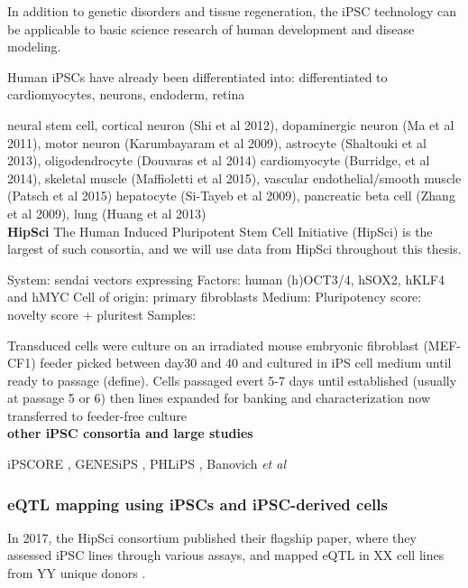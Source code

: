 In addition to genetic disorders and tissue regeneration, the iPSC technology can be applicable to basic science research of human development and disease modeling.

Human iPSCs have already been differentiated into: 
differentiated to cardiomyocytes, neurons, endoderm, retina

neural stem cell, cortical neuron (Shi et al 2012), dopaminergic neuron (Ma et al 2011), motor neuron (Karumbayaram et al 2009), astrocyte (Shaltouki et al 2013), oligodendrocyte (Douvaras et al 2014)
cardiomyocyte (Burridge, et al 2014), skeletal muscle (Maffioletti et al 2015), vascular endothelial/smooth muscle (Patsch et al 2015)
hepatocyte (Si-Tayeb et al 2009), pancreatic beta cell (Zhang et al 2009), lung (Huang et al 2013)\\



\textbf{HipSci}
The Human Induced Pluripotent Stem Cell Initiative (HipSci) is the largest of such consortia, and we will use data from HipSci \cite{kilpinen2017common} throughout this thesis.

System: sendai vectors expressing  
Factors: human (h)OCT3/4, hSOX2, hKLF4 and hMYC
Cell of origin: primary fibroblasts
Medium:
Pluripotency score: novelty score + pluritest \cite{muller2011bioinformatic}
Samples:

Transduced cells were culture on an irradiated mouse embryonic fibroblast (MEF-CF1) feeder
picked between day30 and 40 and cultured in iPS cell medium until ready to passage (define). 
Cells passaged evert 5-7 days until established (usually at passage 5 or 6)
then lines expanded for banking and characterization
now transferred to feeder-free culture\\

\textbf{other iPSC consortia and large studies}

iPSCORE \cite{panopoulos2017ipscore}, GENESiPS \cite{carcamo2017analysis}, PHLiPS \cite{pashos2017large}, Banovich \textit{et al} \cite{banovich2018impact}

\subsubsection{eQTL mapping using iPSCs and iPSC-derived cells}

In 2017, the HipSci consortium published their flagship paper, where they assessed iPSC lines through various assays, and mapped eQTL in XX cell lines from YY unique donors
\cite{kilpinen2017common}.

